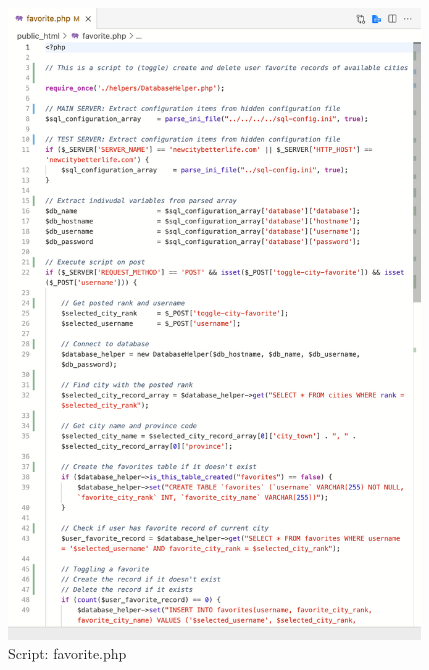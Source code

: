 \documentclass[12pt, letterpaper]{article}
\begin{document}
\begin{figure}[htbp]
	\centering
	\includegraphics[width=4.3in]{images/22-script-2.png}
	\caption{Script: favorite.php}
 \end{figure}

\end{document}
